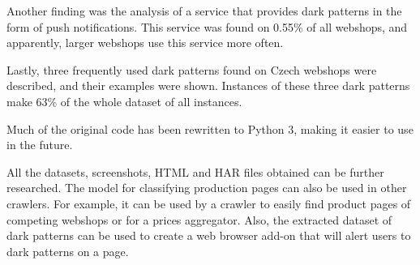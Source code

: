 Another finding was the analysis of a service that provides dark patterns in the form of push notifications. This service was found on 0.55\% of all webshops, and apparently, larger webshops use this service more often.

Lastly, three frequently used dark patterns found on Czech webshops were described, and their examples were shown. Instances of these three dark patterns make 63\% of the whole dataset of all instances.

Much of the original code has been rewritten to Python 3, making it easier to use in the future.

All the datasets, screenshots, HTML and HAR files obtained can be further researched. The model for classifying production pages can also be used in other crawlers. For example, it can be used by a crawler to easily find product pages of competing webshops or for a prices aggregator. Also, the extracted dataset of dark patterns can be used to create a web browser add-on that will alert users to dark patterns on a page.
